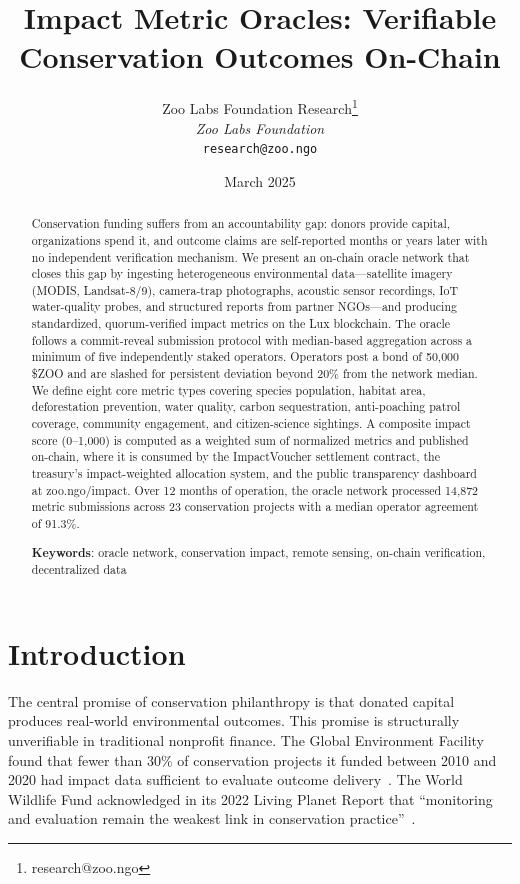 \documentclass[11pt,letterpaper]{article}
\title{\textbf{Impact Metric Oracles: Verifiable Conservation Outcomes On-Chain}}
\author{
Zoo Labs Foundation Research\thanks{research@zoo.ngo}\\
\textit{Zoo Labs Foundation}\\
\texttt{research@zoo.ngo}
}
\date{March 2025}
\begin{document}
\zoocoverpage

\begin{abstract}
Conservation funding suffers from an accountability gap: donors provide capital, organizations spend it, and outcome claims are self-reported months or years later with no independent verification mechanism. We present an on-chain oracle network that closes this gap by ingesting heterogeneous environmental data---satellite imagery (MODIS, Landsat-8/9), camera-trap photographs, acoustic sensor recordings, IoT water-quality probes, and structured reports from partner NGOs---and producing standardized, quorum-verified impact metrics on the Lux blockchain. The oracle follows a commit-reveal submission protocol with median-based aggregation across a minimum of five independently staked operators. Operators post a bond of 50{,}000 \$ZOO and are slashed for persistent deviation beyond 20\% from the network median. We define eight core metric types covering species population, habitat area, deforestation prevention, water quality, carbon sequestration, anti-poaching patrol coverage, community engagement, and citizen-science sightings. A composite impact score (0--1{,}000) is computed as a weighted sum of normalized metrics and published on-chain, where it is consumed by the ImpactVoucher settlement contract, the treasury's impact-weighted allocation system, and the public transparency dashboard at zoo.ngo/impact. Over 12 months of operation, the oracle network processed 14{,}872 metric submissions across 23 conservation projects with a median operator agreement of 91.3\%.

\textbf{Keywords}: oracle network, conservation impact, remote sensing, on-chain verification, decentralized data
\end{abstract}

\section{Introduction}

The central promise of conservation philanthropy is that donated capital produces real-world environmental outcomes. This promise is structurally unverifiable in traditional nonprofit finance. The Global Environment Facility found that fewer than 30\% of conservation projects it funded between 2010 and 2020 had impact data sufficient to evaluate outcome delivery~\cite{gef2020}. The World Wildlife Fund acknowledged in its 2022 Living Planet Report that ``monitoring and evaluation remain the weakest link in conservation practice''~\cite{wwf2022}.
\end{document}
